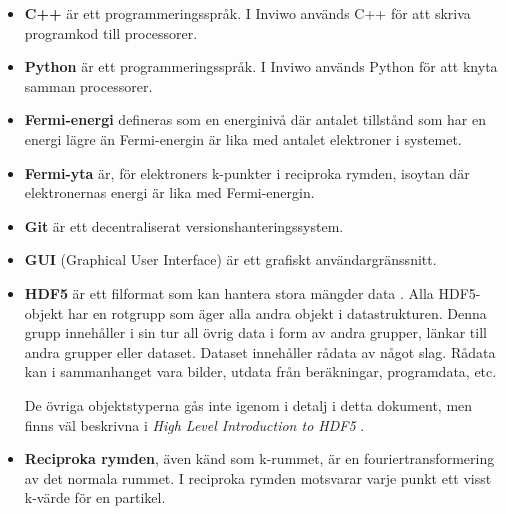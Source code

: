 \documentclass[a4paper,12pt]{article}
\begin{document}
\begin{itemize}
\item \textbf{C++} är ett programmeringsspråk.
	\cite{C++}
	\newline
	I Inviwo används C++ för att skriva programkod till processorer.

\item \textbf{Python} är ett programmeringsspråk.
	\cite{Python}
	\newline
	I Inviwo används Python för att knyta samman processorer.


\item \textbf{Fermi-energi} defineras som en energinivå där antalet tillstånd som har en energi lägre än Fermi-energin är lika med antalet elektroner i systemet. \cite{Fermi-energi}

\item \textbf{Fermi-yta} är, för elektroners k-punkter i reciproka rymden, isoytan där elektronernas energi är lika med Fermi-energin.
\cite{Fermi-yta}

\item \textbf{Git} är ett decentraliserat versionshanteringssystem.
\cite{Git}
    
\item \textbf{GUI} (Graphical User Interface) är ett grafiskt
användargränssnitt.
\cite{GUI}

\item \textbf{HDF5} är ett filformat som kan hantera stora mängder data \cite{hdf5}. Alla HDF5-objekt har en rotgrupp som äger alla andra objekt i datastrukturen. Denna grupp innehåller i sin tur all övrig data i form av andra grupper, länkar till andra grupper eller dataset. Dataset innehåller rådata av något slag. Rådata kan i sammanhanget vara bilder, utdata från beräkningar, programdata, etc. \cites[4-5]{hdf5-intro}

De övriga objektstyperna gås inte igenom i detalj i detta dokument,
men finns väl beskrivna i \emph{High Level Introduction to HDF5} \cite{hdf5-intro}.

\item \textbf{Reciproka rymden}, även känd som k-rummet, är en
fouriertransformering av det normala rummet. I reciproka rymden
motsvarar varje punkt ett visst k-värde för en partikel.
\cite{Reciproka-rymden}


\end{itemize}
\end{document}
